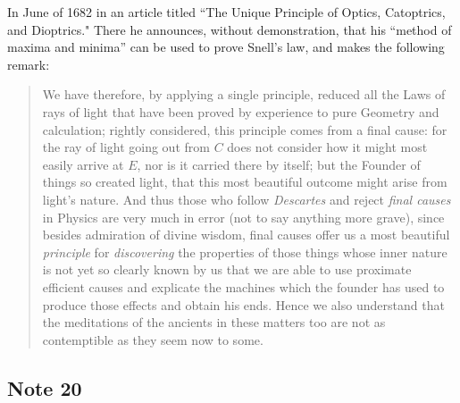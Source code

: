 \documentclass[twoside,openright]{article}
\begin{document}
In June of 1682 in an article titled ``The Unique Principle of Optics,
Catoptrics, and Dioptrics."  There he announces, without
demonstration, that his ``method of maxima and minima'' can be used to
prove Snell's law, and makes the following remark:
\begin{quote}
  We have therefore, by applying a single principle, reduced all the
  Laws of rays of light that have been proved by experience to pure
  Geometry and calculation; rightly considered, this principle comes
  from a final cause: for the ray of light going out from $C$ does not
  consider how it might most easily arrive at $E$, nor is it carried
  there by itself; but the Founder of things so created light, that
  this most beautiful outcome might arise from light's nature. And
  thus those who follow {\em Descartes} and reject {\em final causes}
  in Physics are very much in error (not to say anything more grave),
  since besides admiration of divine wisdom, final causes offer us a
  most beautiful {\em principle} for {\em discovering} the properties
  of those things whose inner nature is not yet so clearly known by us
  that we are able to use proximate efficient causes and explicate the
  machines which the founder has used to produce those effects and
  obtain his ends.  Hence we also understand that the meditations of
  the ancients in these matters too are not as contemptible as they
  seem now to some.
\end{quote}

\subsection*{Note 20}
\label{cnm20}
\end{document}
